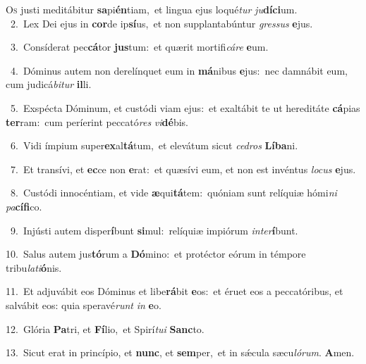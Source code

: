 \lettrine{\initial\textcolor{\initialcolor}{O}}{s} justi meditábitur \textbf{sa}\-pi\-\textbf{én}\-tiam,~\star et lingua ejus loqué\textit{tur} \textit{ju}\-\textbf{dí}\textbf{ci}um.\\
{\numbfont\textcolor{\numbcolor}{~2.}}~Lex Dei ejus in \textbf{cor}\-de ip\-\textbf{sí}\-us,~\star et non supplantabúntur \textit{gres}\-\textit{sus} \textbf{e}\-jus.\par
{\numbfont\textcolor{\numbcolor}{~3.}}~Consíderat pec\-\textbf{cá}\-tor \textbf{jus}\-tum:~\star et quærit mortifi\-\textit{cá}\-\textit{re} \textbf{e}\-um.\par
{\numbfont\textcolor{\numbcolor}{~4.}}~Dóminus autem non derelínquet eum in \textbf{má}\-nibus \textbf{e}\-jus:~\star nec damnábit eum, cum judicá\-\textit{bi}\-\textit{tur} \textbf{il}\-li.\par
{\numbfont\textcolor{\numbcolor}{~5.}}~Exspécta Dóminum, et custódi viam ejus:~\dagger et exaltábit te ut hereditáte \textbf{cá}\-pias \textbf{ter}\-ram:~\star cum períerint peccató\textit{res} \textit{vi}\-\textbf{dé}bis.\par
{\numbfont\textcolor{\numbcolor}{~6.}}~Vidi ímpium super\-\textbf{ex}\-al\-\textbf{tá}\-tum,~\star et elevátum sicut \textit{ce}\-\textit{dros} \textbf{Lí}\-\textbf{ba}ni.\par
{\numbfont\textcolor{\numbcolor}{~7.}}~Et transívi, et \textbf{ec}\-ce non \textbf{e}\-rat:~\star et quæsívi eum, et non est invéntus \textit{lo}\-\textit{cus} \textbf{e}\-jus.\par
{\numbfont\textcolor{\numbcolor}{~8.}}~Custódi innocéntiam, et vide \textbf{æ}\-qui\-\textbf{tá}\-tem:~\star quóniam sunt relíquiæ hómi\textit{ni} \textit{pa}\-\textbf{cí}\textbf{fi}co.\par
{\numbfont\textcolor{\numbcolor}{~9.}}~Injústi autem disper\-\textbf{í}\-bunt \textbf{si}\-mul:~\star relíquiæ impiórum \textit{in}\-\textit{ter}\textbf{í}bunt.\par
{\numbfont\textcolor{\numbcolor}{10.}}~Salus autem jus\-\textbf{tó}\-rum a \textbf{Dó}\-mino:~\star et protéctor eórum in témpore tribu\-\textit{la}\-\textit{ti}\textbf{ó}nis.\par
{\numbfont\textcolor{\numbcolor}{11.}}~Et adjuvábit eos Dóminus et libe\-\textbf{rá}\-bit \textbf{e}\-os:~\star et éruet eos a peccatóribus, et salvábit eos: quia speravé\textit{runt} \textit{in} \textbf{e}\-o.\par
{\numbfont\textcolor{\numbcolor}{12.}}~Glória \textbf{Pa}\-tri, et \textbf{Fí}\-lio,~\star et Spirí\-\textit{tu}\-\textit{i} \textbf{Sanc}\-to.\par
{\numbfont\textcolor{\numbcolor}{13.}}~Sicut erat in princípio, et \textbf{nunc}\-, et \textbf{sem}\-per,~\star et in sǽcula sæcu\-\textit{ló}\-\textit{rum}. \textbf{A}\-men.\par
